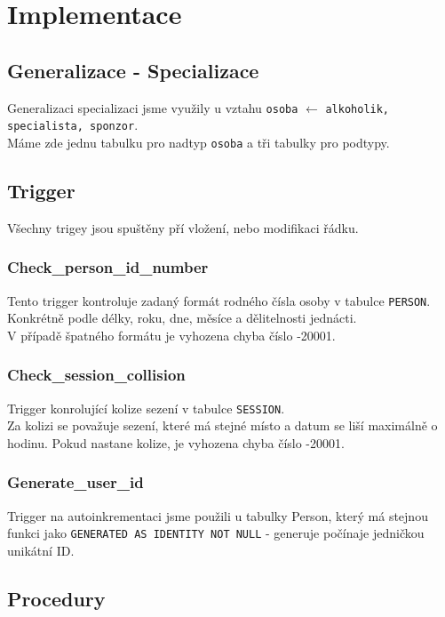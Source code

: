 \documentclass[11pt, a4paper]{article}
\begin{document}
 \newpage

\section{Implementace}
\subsection{Generalizace - Specializace}
Generalizaci specializaci jsme využily u vztahu \texttt{osoba} $\leftarrow$ \texttt{alkoholik, specialista, sponzor}.\\
Máme zde jednu tabulku pro nadtyp \texttt{osoba} a tři tabulky pro podtypy.

\subsection{Trigger}
Všechny trigey jsou spuštěny pří vložení, nebo modifikaci řádku.

\subsubsection*{Check\_person\_id\_number}
Tento trigger kontroluje zadaný formát rodného čísla osoby v tabulce \texttt{PERSON}.
Konkrétně podle délky, roku, dne, měsíce a dělitelnosti jednácti.\\
V případě špatného formátu je vyhozena chyba číslo -20001.

\subsubsection*{Check\_session\_collision}
Trigger konrolující kolize sezení v tabulce \texttt{SESSION}.\\
Za kolizi se považuje sezení, které má stejné místo a datum se liší maximálně o hodinu.
Pokud nastane kolize, je vyhozena chyba číslo -20001.

\subsubsection*{Generate\_user\_id}
Trigger na autoinkrementaci jsme použili u tabulky Person, který má stejnou funkci jako  \texttt{GENERATED AS IDENTITY NOT NULL} - generuje počínaje jedničkou unikátní ID.\\

\subsection{Procedury}
\end{document}
